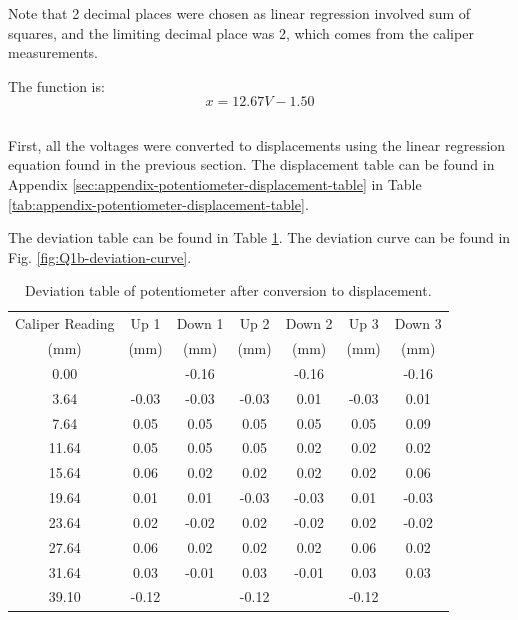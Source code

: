 Note that 2 decimal places were chosen as linear regression involved sum of squares, and the limiting
decimal place was 2, which comes from the caliper measurements.

The function is:
\[\boxed{x = 12.67V - 1.50}\]

\subsection{}

First, all the voltages were converted to displacements using the linear regression equation found in the previous section. The
displacement table can be found in Appendix \ref{sec:appendix-potentiometer-displacement-table} in Table \ref{tab:appendix-potentiometer-displacement-table}.

The deviation table can be found in Table \ref{tab:Q1b-deviation-table}. The deviation curve can be found in Fig. \ref{fig:Q1b-deviation-curve}.

\begin{table}[h]
    \centering
    \caption{Deviation table of potentiometer after conversion to displacement.}
    \label{tab:Q1b-deviation-table}
    \begin{tabular}{ccccccc}
        \hline
        Caliper Reading & Up 1 & Down 1 & Up 2 & Down 2 & Up 3 & Down 3 \\
        (mm) & (mm) & (mm) & (mm) & (mm) & (mm) & (mm) \\
        \midrule
        0.00 & & -0.16 & & -0.16 & & -0.16 \\
        3.64 & -0.03 & -0.03 & -0.03 & 0.01 & -0.03 & 0.01 \\
        7.64 & 0.05 & 0.05 & 0.05 & 0.05 & 0.05 & 0.09 \\
        11.64 & 0.05 & 0.05 & 0.05 & 0.02 & 0.02 & 0.02 \\
        15.64 & 0.06 & 0.02 & 0.02 & 0.02 & 0.02 & 0.06 \\
        19.64 & 0.01 & 0.01 & -0.03 & -0.03 & 0.01 & -0.03 \\
        23.64 & 0.02 & -0.02 & 0.02 & -0.02 & 0.02 & -0.02 \\
        27.64 & 0.06 & 0.02 & 0.02 & 0.02 & 0.06 & 0.02 \\
        31.64 & 0.03 & -0.01 & 0.03 & -0.01 & 0.03 & 0.03 \\
        39.10 & -0.12 & & -0.12 & & -0.12 \\
        \hline
    \end{tabular}
\end{table}

